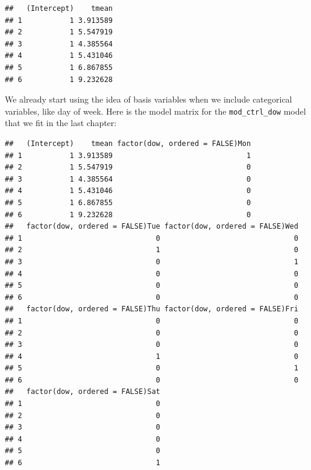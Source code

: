 \documentclass[
]{book}
\newenvironment{Shaded}{\begin{snugshade}}{\end{snugshade}}
\newcommand{\KeywordTok}[1]{\textcolor[rgb]{0.13,0.29,0.53}{\textbf{#1}}}
\newcommand{\NormalTok}[1]{#1}
\newcommand{\OperatorTok}[1]{\textcolor[rgb]{0.81,0.36,0.00}{\textbf{#1}}}
\newcommand{\StringTok}[1]{\textcolor[rgb]{0.31,0.60,0.02}{#1}}
\begin{document}
\begin{Shaded}
\end{Shaded}

\begin{verbatim}
##   (Intercept)    tmean
## 1           1 3.913589
## 2           1 5.547919
## 3           1 4.385564
## 4           1 5.431046
## 5           1 6.867855
## 6           1 9.232628
\end{verbatim}

We already start using the idea of basis variables when we include categorical variables, like
day of week. Here is the model matrix for the \texttt{mod\_ctrl\_dow} model that we fit in the last
chapter:

\begin{Shaded}
\end{Shaded}

\begin{verbatim}
##   (Intercept)    tmean factor(dow, ordered = FALSE)Mon
## 1           1 3.913589                               1
## 2           1 5.547919                               0
## 3           1 4.385564                               0
## 4           1 5.431046                               0
## 5           1 6.867855                               0
## 6           1 9.232628                               0
##   factor(dow, ordered = FALSE)Tue factor(dow, ordered = FALSE)Wed
## 1                               0                               0
## 2                               1                               0
## 3                               0                               1
## 4                               0                               0
## 5                               0                               0
## 6                               0                               0
##   factor(dow, ordered = FALSE)Thu factor(dow, ordered = FALSE)Fri
## 1                               0                               0
## 2                               0                               0
## 3                               0                               0
## 4                               1                               0
## 5                               0                               1
## 6                               0                               0
##   factor(dow, ordered = FALSE)Sat
## 1                               0
## 2                               0
## 3                               0
## 4                               0
## 5                               0
## 6                               1
\end{verbatim}
\end{document}
